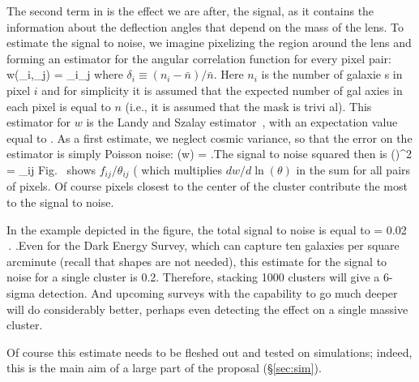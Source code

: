 The second term in  is the effect we are after, the signal,
as it contains the information about the deflection angles that
depend on the mass of the lens. To estimate the signal to noise, we
imagine pixelizing the region around the lens and forming an
estimator for the angular correlation function for every pixel pair:
\be \hat w(\vec\theta_i,\vec\theta_j) = \delta_i\delta_j \ee where
$\delta_i\equiv (n_i-\bar n)/\bar n$. Here $n_i$ is the number of
galaxie s in pixel $i$ and for simplicity it is assumed that the
expected number of gal axies in each pixel is equal to $n$ (i.e., it
is assumed that the mask is trivi al). This estimator for $w$ is the
Landy and Szalay estimator~\cite{1993ApJ...412...64L}, with an expectation value equal to
.  As a first estimate, we neglect cosmic variance, so
that the error on the estimator is simply Poisson noise: (\hat w) =  .\ee The signal to noise squared
then is \be \left(\right)^2 = \sum_{ij}
 \ee
Fig.~ shows $f_{ij}/\theta_{ij}$ ( which multiplies
$dw/d\ln(\theta)$ in the sum for all pairs of pixels. Of course pixels
closest to the center of the cluster contribute the most to the signal
to noise.


In the example depicted in the figure, the total signal to noise is
equal to \be {} = 0.02 
\,.  .\ee Even for the Dark Energy
Survey, which can capture ten galaxies per square arcminute (recall that
shapes are not needed), this estimate for the signal to noise for a single cluster is
0.2. Therefore, stacking 1000 clusters will give a 6-sigma
detection. And upcoming surveys with the capability to go much deeper
will do considerably better, perhaps even detecting the effect on a
single massive cluster.

Of course this estimate needs to be fleshed out and tested on simulations; 
indeed, this is the main aim of a large part of the proposal (\S\ref{sec:sim}).






